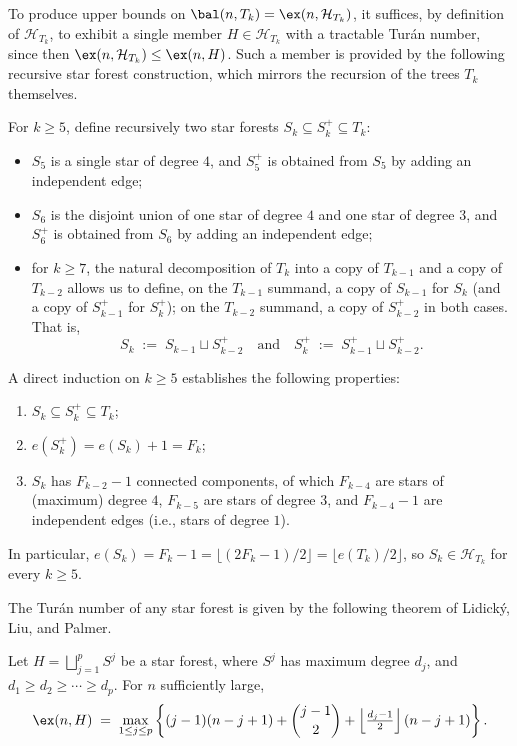 To produce upper bounds on $\bal(n,T_k)=\ex(n,\mathcal H_{T_k})$, it suffices, by definition of $\mathcal H_{T_k}$, to exhibit a single member $H\in\mathcal H_{T_k}$ with a tractable Tur\'an number, since then $\ex(n,\mathcal H_{T_k})\leq\ex(n,H)$.
Such a member is provided by the following recursive star forest construction, which mirrors the recursion of the trees $T_k$ themselves.

For $k\geq 5$, define recursively two star forests $S_k\subseteq S_k^+\subseteq T_k$:
\begin{itemize}
    \item $S_5$ is a single star of degree $4$, and $S_5^+$ is obtained from $S_5$ by adding an independent edge;
    \item $S_6$ is the disjoint union of one star of degree $4$ and one star of degree $3$, and $S_6^+$ is obtained from $S_6$ by adding an independent edge;
    \item for $k\geq 7$, the natural decomposition of $T_k$ into a copy of $T_{k-1}$ and a copy of $T_{k-2}$ allows us to define, on the $T_{k-1}$ summand, a copy of $S_{k-1}$ for $S_k$ (and a copy of $S_{k-1}^+$ for $S_k^+$); on the $T_{k-2}$ summand, a copy of $S_{k-2}^+$ in both cases.
    That is,
    $$
        S_k\;:=\;S_{k-1}\sqcup S_{k-2}^+\quad\text{and}\quad S_k^+\;:=\;S_{k-1}^+\sqcup S_{k-2}^+.
    $$
\end{itemize}
A direct induction on $k\geq 5$ establishes the following properties:
\begin{enumerate}
    \item $S_k\subseteq S_k^+\subseteq T_k$;
    \item $e(S_k^+)=e(S_k)+1=F_k$;
    \item $S_k$ has $F_{k-2}-1$ connected components, of which $F_{k-4}$ are stars of (maximum) degree $4$, $F_{k-5}$ are stars of degree $3$, and $F_{k-4}-1$ are independent edges (i.e., stars of degree $1$).
\end{enumerate}
In particular, $e(S_k)=F_k-1=\lfloor(2F_k-1)/2\rfloor=\lfloor e(T_k)/2\rfloor$, so $S_k\in\mathcal H_{T_k}$ for every $k\geq 5$.

The Tur\'an number of any star forest is given by the following theorem of Lidick\'y, Liu, and Palmer.

\begin{theorem}\label{thm:LLP_star_forest}
    Let $H=\bigsqcup_{j=1}^p S^j$ be a star forest, where $S^j$ has maximum degree $d_j$, and $d_1\geq d_2\geq\cdots\geq d_p$.
    For $n$ sufficiently large,
    $$
        \ex(n,H)\;=\;\max_{1\leq j\leq p}\left\{(j-1)(n-j+1)+\binom{j-1}{2}+\left\lfloor\tfrac{d_j-1}{2}\right\rfloor(n-j+1)\right\}.
    $$
\end{theorem}

